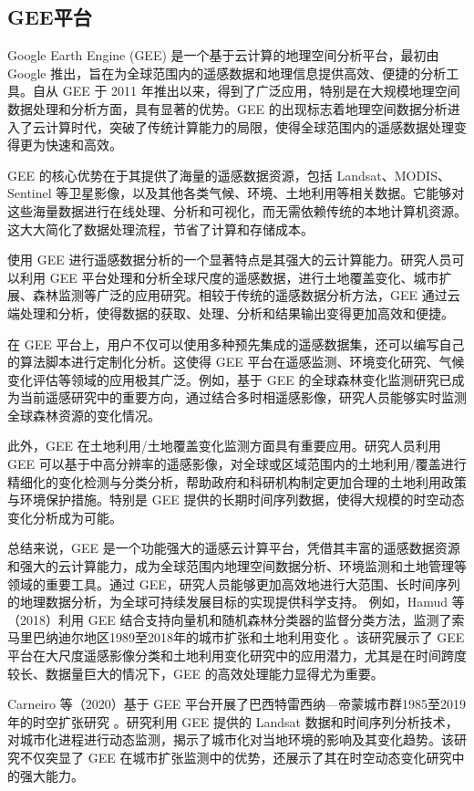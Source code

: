\documentclass{article}
\begin{document}
		
	\subsection{GEE平台}
	Google Earth Engine (GEE) 是一个基于云计算的地理空间分析平台，最初由 Google 推出，旨在为全球范围内的遥感数据和地理信息提供高效、便捷的分析工具。自从 GEE 于 2011 年推出以来，得到了广泛应用，特别是在大规模地理空间数据处理和分析方面，具有显著的优势。GEE 的出现标志着地理空间数据分析进入了云计算时代，突破了传统计算能力的局限，使得全球范围内的遥感数据处理变得更为快速和高效。
	
	GEE 的核心优势在于其提供了海量的遥感数据资源，包括 Landsat、MODIS、Sentinel 等卫星影像，以及其他各类气候、环境、土地利用等相关数据。它能够对这些海量数据进行在线处理、分析和可视化，而无需依赖传统的本地计算机资源。这大大简化了数据处理流程，节省了计算和存储成本。
	
	使用 GEE 进行遥感数据分析的一个显著特点是其强大的云计算能力。研究人员可以利用 GEE 平台处理和分析全球尺度的遥感数据，进行土地覆盖变化、城市扩展、森林监测等广泛的应用研究。相较于传统的遥感数据分析方法，GEE 通过云端处理和分析，使得数据的获取、处理、分析和结果输出变得更加高效和便捷。
	
	在 GEE 平台上，用户不仅可以使用多种预先集成的遥感数据集，还可以编写自己的算法脚本进行定制化分析。这使得 GEE 平台在遥感监测、环境变化研究、气候变化评估等领域的应用极其广泛。例如，基于 GEE 的全球森林变化监测研究已成为当前遥感研究中的重要方向，通过结合多时相遥感影像，研究人员能够实时监测全球森林资源的变化情况。
	
	此外，GEE 在土地利用/土地覆盖变化监测方面具有重要应用。研究人员利用 GEE 可以基于中高分辨率的遥感影像，对全球或区域范围内的土地利用/覆盖进行精细化的变化检测与分类分析，帮助政府和科研机构制定更加合理的土地利用政策与环境保护措施。特别是 GEE 提供的长期时间序列数据，使得大规模的时空动态变化分析成为可能。
	
	总结来说，GEE 是一个功能强大的遥感云计算平台，凭借其丰富的遥感数据资源和强大的云计算能力，成为全球范围内地理空间数据分析、环境监测和土地管理等领域的重要工具。通过 GEE，研究人员能够更加高效地进行大范围、长时间序列的地理数据分析，为全球可持续发展目标的实现提供科学支持。
	例如，Hamud 等（2018）利用 GEE 结合支持向量机和随机森林分类器的监督分类方法，监测了索马里巴纳迪尔地区1989至2018年的城市扩张和土地利用变化 \cite{Hamud2018}。该研究展示了 GEE 平台在大尺度遥感影像分类和土地利用变化研究中的应用潜力，尤其是在时间跨度较长、数据量巨大的情况下，GEE 的高效处理能力显得尤为重要。
	
	Carneiro 等（2020）基于 GEE 平台开展了巴西特雷西纳—帝蒙城市群1985至2019年的时空扩张研究 \cite{Carneiro2020}。研究利用 GEE 提供的 Landsat 数据和时间序列分析技术，对城市化进程进行动态监测，揭示了城市化对当地环境的影响及其变化趋势。该研究不仅突显了 GEE 在城市扩张监测中的优势，还展示了其在时空动态变化研究中的强大能力。
	
\end{document}
